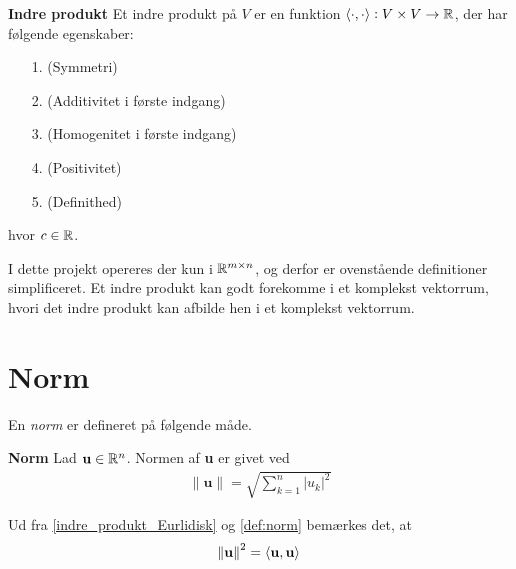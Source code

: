 \begin{defn}\textbf{Indre produkt}\label{indre_produkt_defn}
    \newline
    Et indre produkt på $V$ er en funktion ${\langle \cdot,\cdot \rangle}: V \times V \to \mathbb{R}$, der har følgende egenskaber:\\
    \begin{itemize}
        \item[1.]{} \quad (Symmetri)
         \item[2.]{} \quad (Additivitet i første indgang)
         \item[3.]{} \quad (Homogenitet i første indgang)
         \item[4.]{} \quad (Positivitet)
         \item[5.]{} \quad (Definithed)
    \end{itemize}
    hvor $c \in \mathbb{R}$.
\end{defn}

I dette projekt opereres der kun i $\mathbb{R}^{m \times n}$, og derfor er ovenstående definitioner simplificeret. Et indre produkt kan godt forekomme i et komplekst vektorrum, hvori det indre produkt kan afbilde hen i et komplekst vektorrum.

\section{Norm}
En \textit{norm} er defineret på følgende måde.
\begin{defn}\textbf{Norm}\label{def:norm} %
\newline
Lad $\textbf{u} \in \mathbb{R}^n$. Normen af \textbf{u} er givet ved 
\begin{align*}
    \|\mathbf{u}\| = \sqrt{\sum^n_{k=1}|u_k|^2}
\end{align*}
\end{defn}

Ud fra \autoref{indre_produkt_Eurlidisk} og \autoref{def:norm} bemærkes det, at
\begin{align}\label{normen_i_anden_er_lig_kvadratroden_af_indreprodukt}
    \norm{\textbf{u}}^2 = \langle \textbf{u},\textbf{u}\rangle
\end{align}

